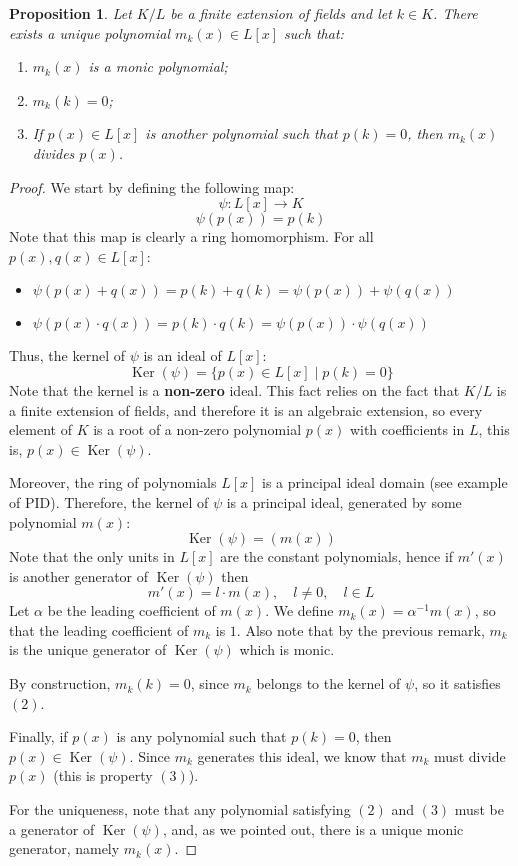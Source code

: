 \documentclass[12pt]{article}
\newtheorem{prop}{Proposition}
\begin{document}
\begin{prop}
Let $K/L$ be a finite extension of fields and let $k\in K$. There
exists a unique polynomial $m_{k}(x)\in L[x]$ such that:
\begin{enumerate}
\item $m_{k}(x)$ is a monic polynomial;

\item $m_{k}(k)=0$;

\item If $p(x)\in L[x]$ is another polynomial such that $p(k)=0$,
then $m_{k}(x)$ divides $p(x)$.
\end{enumerate}
\end{prop}
\begin{proof}
We start by defining the following map: $$\psi\colon L[x] \to K$$
$$\psi(p(x))=p(k)$$
Note that this map is clearly a ring homomorphism. For all
$p(x),q(x) \in L[x]$:
\begin{itemize}
\item $\psi(p(x)+q(x))=p(k)+q(k)=\psi(p(x))+\psi(q(x))$

\item $\psi(p(x)\cdot q(x))=p(k)\cdot
q(k)=\psi(p(x))\cdot\psi(q(x))$
\end{itemize}
Thus, the kernel of $\psi$ is an ideal of $L[x]$:
$$\operatorname{Ker}(\psi)=\{ p(x)\in L[x] \mid p(k)=0 \}$$
Note that the kernel is a {\bf non-zero} ideal. This fact relies
on the fact that $K/L$ is a finite extension of fields, and
therefore it is an algebraic extension, so every element of $K$ is
a root of a non-zero polynomial $p(x)$ with coefficients in $L$,
this is, $p(x)\in \operatorname{Ker}(\psi)$.

Moreover, the ring of polynomials $L[x]$ is a principal ideal
domain (see example of PID).
Therefore, the kernel of $\psi$ is a principal ideal, generated by
some polynomial $m(x)$:
$$\operatorname{Ker}(\psi)=(m(x))$$
Note that the only units in $L[x]$ are the constant polynomials,
hence if $m'(x)$ is another generator of
$\operatorname{Ker}(\psi)$ then
$$m'(x)=l\cdot m(x), \quad l\neq 0,\quad l\in L$$
Let $\alpha$ be the leading coefficient of $m(x)$. We define
$m_{k}(x)=\alpha^{-1}m(x)$, so that the leading coefficient of
$m_{k}$ is $1$. Also note that by the previous remark, $m_{k}$ is
the unique generator of $\operatorname{Ker}(\psi)$ which is monic.

By construction, $m_{k}(k)=0$, since $m_{k}$ belongs to the kernel
of $\psi$, so it satisfies $(2)$.

Finally, if $p(x)$ is any polynomial such that $p(k)=0$, then
$p(x) \in \operatorname{Ker}(\psi)$. Since $m_{k}$ generates this
ideal, we know that $m_{k}$ must divide $p(x)$ (this is property
$(3)$).

For the uniqueness, note that any polynomial satisfying $(2)$ and
$(3)$ must be a generator of $\operatorname{Ker}(\psi)$, and, as
we pointed out, there is a unique monic generator, namely
$m_{k}(x)$.

\end{proof}
\end{document}
